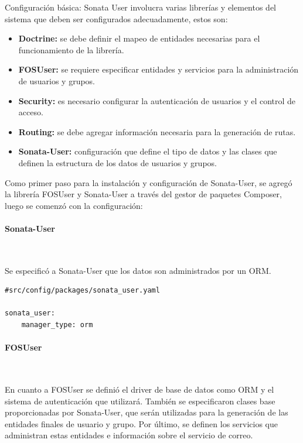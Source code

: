 Configuración básica: Sonata User involucra varias librerías y elementos del sistema que deben ser configurados adecuadamente, estos son:

\begin{itemize}
    \item \textbf{Doctrine:} se debe definir el mapeo de entidades necesarias para el funcionamiento de la librería.
    \item \textbf{FOSUser:} se requiere especificar entidades y servicios para la administración de usuarios y grupos.
    \item \textbf{Security:} es necesario configurar la autenticación de usuarios y el control de acceso.
    \item \textbf{Routing:} se debe agregar información necesaria para la generación de rutas.
    \item \textbf{Sonata-User:} configuración que define el tipo de datos y las clases que definen la estructura de los datos de usuarios y grupos.
\end{itemize}



Como primer paso para la instalación y configuración de Sonata-User, se agregó la librería FOSUser y Sonata-User a través del gestor de paquetes Composer,
luego se comenzó con la configuración:

\paragraph{Sonata-User}~\newline

Se especificó a Sonata-User que los datos son administrados por un ORM.

\begin{lstlisting}[caption={archivo de configuración de sonata-user\\Fuente: \sonatainstallation.}]
#src/config/packages/sonata_user.yaml

sonata_user:
    manager_type: orm

\end{lstlisting}

\paragraph{FOSUser}~\newline

En cuanto a FOSUser se definió el driver de base de datos como ORM y el sistema de autenticación que utilizará\@. También se especificaron clases base
proporcionadas por Sonata-User, que serán utilizadas para la generación de las entidades finales de usuario y grupo\@. Por último, se definen los servicios
que administran estas entidades e información sobre el servicio de correo.

